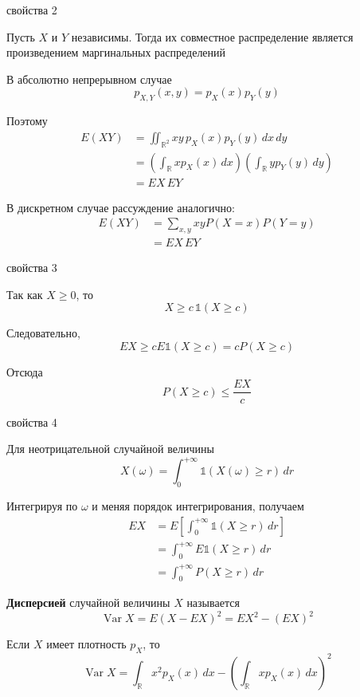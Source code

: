\documentclass[12pt,a4paper]{article}
\begin{document}
\begin{proofbox}{свойства 2}

Пусть $X$ и $Y$ независимы. Тогда их совместное распределение является произведением маргинальных распределений

В абсолютно непрерывном случае
\[
p_{X,Y}(x,y)=p_X(x)p_Y(y)
\]

Поэтому
\[
\begin{aligned}
E(XY)
&=
\iint_{\mathbb{R}^2}xy\,p_X(x)p_Y(y)\,dx\,dy\\
&=
\left(\int_{\mathbb{R}}x p_X(x)\,dx\right)
\left(\int_{\mathbb{R}}y p_Y(y)\,dy\right)\\
&=
EX\,EY
\end{aligned}
\]

В дискретном случае рассуждение аналогично:
\[
\begin{aligned}
E(XY)
&=
\sum_{x,y}xyP(X=x)P(Y=y)\\
&=
EX\,EY
\end{aligned}
\]

\end{proofbox}

\begin{proofbox}{свойства 3}

Так как $X\geq0$, то
\[
X\geq c\,\mathds{1}(X\geq c)
\]

Следовательно,
\[
EX
\geq
cE\mathds{1}(X\geq c)
=
cP(X\geq c)
\]

Отсюда
\[
P(X\geq c)
\leq
\frac{EX}{c}
\]

\end{proofbox}

\begin{proofbox}{свойства 4}

Для неотрицательной случайной величины
\[
X(\omega)
=
\int_0^{+\infty}
\mathds{1}(X(\omega)\geq r)\,dr
\]

Интегрируя по $\omega$ и меняя порядок интегрирования, получаем
\[
\begin{aligned}
EX
&=
E\left[
\int_0^{+\infty}
\mathds{1}(X\geq r)\,dr
\right]\\
&=
\int_0^{+\infty}
E\mathds{1}(X\geq r)\,dr\\
&=
\int_0^{+\infty}
P(X\geq r)\,dr
\end{aligned}
\]

\end{proofbox}

\begin{definition}

\textbf{Дисперсией} случайной величины $X$ называется
\[
\operatorname{Var}X
=
E(X-EX)^2
=
EX^2-(EX)^2
\]

Если $X$ имеет плотность $p_X$, то
\[
\operatorname{Var}X
=
\int_{\mathbb{R}}x^2p_X(x)\,dx
-
\left(
\int_{\mathbb{R}}xp_X(x)\,dx
\right)^2
\]

\end{definition}
\end{document}
